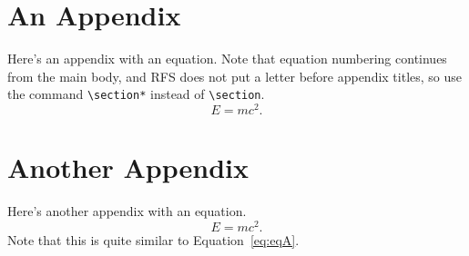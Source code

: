 \documentclass[11pt]{article}
\begin{document}
\newpage

\appendix

\section*{An Appendix}
\label{sec:app1}

Here's an appendix with an equation. Note that equation numbering continues from the main body, and RFS does not put a letter before appendix titles, so use the command \verb|\section*| instead of \verb|\section|.
\begin{equation}
  E = mc^2.
\label{eq:eqA}
\end{equation}

\section*{Another Appendix}
\label{sec:app2}

Here's another appendix with an equation.
\begin{equation}
  E = mc^2.
\end{equation}
Note that this is quite similar to Equation~\eqref{eq:eqA}.

\clearpage


\begin{doublespacing}


\end{doublespacing}

\clearpage

\renewcommand{\enotesize}{\normalsize}
\begin{doublespacing}
  \theendnotes
\end{doublespacing}

\clearpage
\end{document}
